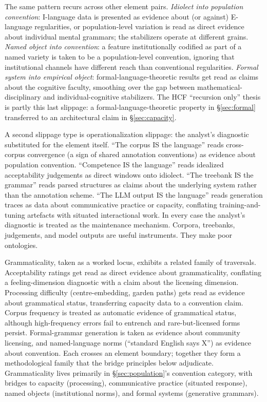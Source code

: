 \documentclass[12pt]{article}
\begin{document}
The same pattern recurs across other element pairs. \emph{Idiolect into population convention}: I-language data is presented as evidence about (or against) E-language regularities, or population-level variation is read as direct evidence about individual mental grammars; the stabilizers operate at different grains. \emph{Named object into convention}: a feature institutionally codified as part of a named variety is taken to be a population-level convention, ignoring that institutional channels have different reach than conventional regularities. \emph{Formal system into empirical object}: formal-language-theoretic results get read as claims about the cognitive faculty, smoothing over the gap between mathematical-disciplinary and individual-cognitive stabilizers. The HCF \enquote{recursion only} thesis is partly this last slippage: a formal-language-theoretic property in §\ref{sec:formal} transferred to an architectural claim in §\ref{sec:capacity}.

A second slippage type is operationalization slippage: the analyst's diagnostic substituted for the element itself. \enquote{The corpus IS the language} reads cross-corpus convergence (a sign of shared annotation conventions) as evidence about population convention. \enquote{Competence IS the language} reads idealized acceptability judgements as direct windows onto idiolect. \enquote{The treebank IS the grammar} reads parsed structures as claims about the underlying system rather than the annotation scheme. \enquote{The LLM output IS the language} reads generation traces as data about communicative practice or capacity, conflating training-and-tuning artefacts with situated interactional work. In every case the analyst's diagnostic is treated as the maintenance mechanism. Corpora, treebanks, judgements, and model outputs are useful instruments. They make poor ontologies.

Grammaticality, taken as a worked locus, exhibits a related family of traversals. Acceptability ratings get read as direct evidence about grammaticality, conflating a feeling-dimension diagnostic with a claim about the licensing dimension. Processing difficulty (centre-embedding, garden paths) gets read as evidence about grammatical status, transferring capacity data to a convention claim. Corpus frequency is treated as automatic evidence of grammatical status, although high-frequency errors fail to entrench and rare-but-licensed forms persist. Formal-grammar generation is taken as evidence about community licensing, and named-language norms (\enquote{standard English says X}) as evidence about convention. Each crosses an element boundary; together they form a methodological family that the bridge principles below adjudicate. Grammaticality lives primarily in §\ref{sec:population}'s convention category, with bridges to capacity (processing), communicative practice (situated response), named objects (institutional norms), and formal systems (generative grammars).
\end{document}
